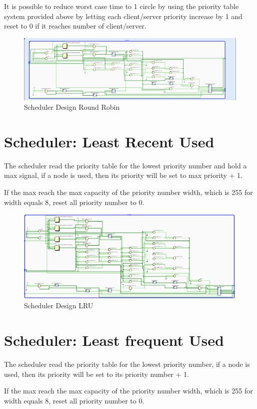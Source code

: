 It is possible to reduce worst case time to 1 circle by using the priority table system provided above by letting each client/server priority increase by 1 and reset to 0 if it reaches number of client/server.

\begin{figure}[htb]
	\centering
	\includegraphics[width=.8\linewidth]{figures/Scheduler.png}
	\caption{Scheduler Design Round Robin}
	\label{fig:schedulerRR}
\end{figure}


\section{Scheduler: Least Recent Used}

The scheduler read the priority table for the lowest priority number and hold a max signal, if a node is used, then its priority will be set to max priority + 1.

If the max reach the max capacity of the priority number width, which is 255 for width equals 8, reset all priority number to 0.

\begin{figure}[htb]
	\centering
	\includegraphics[width=.8\linewidth]{figures/new-sim/scheduler.png}
	\caption{Scheduler Design LRU}
	\label{fig:schedulerLRU}
\end{figure}


\section{Scheduler: Least frequent Used}

The scheduler read the priority table for the lowest priority number, if a node is used, then its priority will be set to its priority number + 1.

If the max reach the max capacity of the priority number width, which is 255 for width equals 8, reset all priority number to 0.
